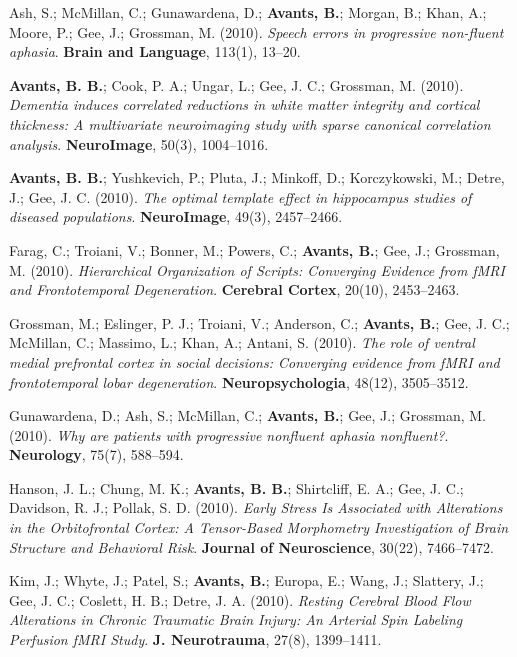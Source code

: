 \documentclass[10pt,letterpaper]{article}
\begin{document}
\begin{enumerate}
{  %
  \item Ash, S.; McMillan, C.; Gunawardena, D.; \textbf{Avants, B.}; Morgan, B.; Khan, A.; Moore, P.; Gee, J.; Grossman, M. (2010). \textit{Speech errors in progressive non-fluent aphasia}. \textbf{Brain and Language}, 113(1), 13--20.
  \item \textbf{Avants, B. B.}; Cook, P. A.; Ungar, L.; Gee, J. C.; Grossman, M. (2010). \textit{Dementia induces correlated reductions in white matter integrity and cortical thickness: A multivariate neuroimaging study with sparse canonical correlation analysis}. \textbf{NeuroImage}, 50(3), 1004--1016.
  \item \textbf{Avants, B. B.}; Yushkevich, P.; Pluta, J.; Minkoff, D.; Korczykowski, M.; Detre, J.; Gee, J. C. (2010). \textit{The optimal template effect in hippocampus studies of diseased populations}. \textbf{NeuroImage}, 49(3), 2457--2466.
  \item Farag, C.; Troiani, V.; Bonner, M.; Powers, C.; \textbf{Avants, B.}; Gee, J.; Grossman, M. (2010). \textit{Hierarchical Organization of Scripts: Converging Evidence from fMRI and Frontotemporal Degeneration}. \textbf{Cerebral Cortex}, 20(10), 2453--2463.
  \item Grossman, M.; Eslinger, P. J.; Troiani, V.; Anderson, C.; \textbf{Avants, B.}; Gee, J. C.; McMillan, C.; Massimo, L.; Khan, A.; Antani, S. (2010). \textit{The role of ventral medial prefrontal cortex in social decisions: Converging evidence from fMRI and frontotemporal lobar degeneration}. \textbf{Neuropsychologia}, 48(12), 3505--3512.
  \item Gunawardena, D.; Ash, S.; McMillan, C.; \textbf{Avants, B.}; Gee, J.; Grossman, M. (2010). \textit{Why are patients with progressive nonfluent aphasia nonfluent?}. \textbf{Neurology}, 75(7), 588--594.
  \item Hanson, J. L.; Chung, M. K.; \textbf{Avants, B. B.}; Shirtcliff, E. A.; Gee, J. C.; Davidson, R. J.; Pollak, S. D. (2010). \textit{Early Stress Is Associated with Alterations in the Orbitofrontal Cortex: A Tensor-Based Morphometry Investigation of Brain Structure and Behavioral Risk}. \textbf{Journal of Neuroscience}, 30(22), 7466--7472.
  \item Kim, J.; Whyte, J.; Patel, S.; \textbf{Avants, B.}; Europa, E.; Wang, J.; Slattery, J.; Gee, J. C.; Coslett, H. B.; Detre, J. A. (2010). \textit{Resting Cerebral Blood Flow Alterations in Chronic Traumatic Brain Injury: An Arterial Spin Labeling Perfusion fMRI Study}. \textbf{J. Neurotrauma}, 27(8), 1399--1411.
}
\end{enumerate}
\end{document}
